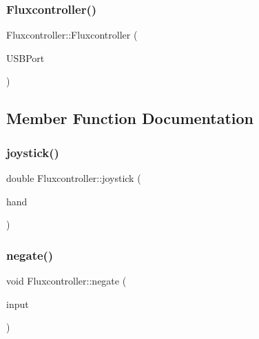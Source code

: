 \subsubsection{\texorpdfstring{Fluxcontroller()}{Fluxcontroller()}}
{\footnotesize\ttfamily Fluxcontroller\+::\+Fluxcontroller (\begin{DoxyParamCaption}\item[{unsigned int}]{U\+S\+B\+Port }\end{DoxyParamCaption})}



\subsection{Member Function Documentation}
\mbox{\label{classFluxcontroller_ab3801948ee5152689b8d8e8ac6e92856}} 
\subsubsection{\texorpdfstring{joystick()}{joystick()}}
{\footnotesize\ttfamily double Fluxcontroller\+::joystick (\begin{DoxyParamCaption}\item[{Generic\+H\+I\+D\+::\+Joystick\+Hand}]{hand }\end{DoxyParamCaption})}

\mbox{\label{classFluxcontroller_ac2d888be1a50f85ccbae685171d5359f}} 
\subsubsection{\texorpdfstring{negate()}{negate()}}
{\footnotesize\ttfamily void Fluxcontroller\+::negate (\begin{DoxyParamCaption}\item[{bool}]{input }\end{DoxyParamCaption})}

\mbox{\label{classFluxcontroller_a82147680c873b1da821dfb48a38f0b9a}} 
